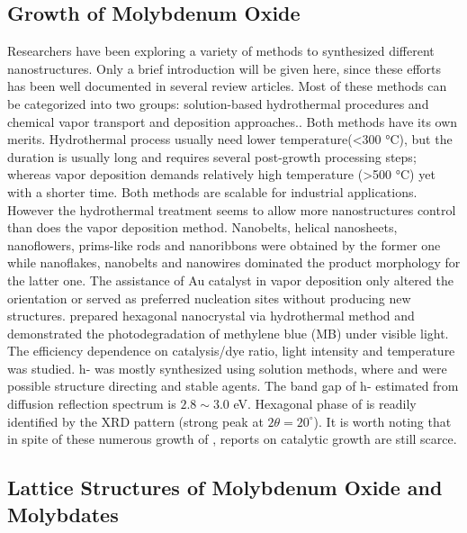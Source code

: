 \subsection{Growth of Molybdenum Oxide}
Researchers have been exploring a variety of methods to synthesized different  nanostructures. Only a brief introduction will be given here, since these efforts has been well documented in several review articles.\cite{He2003} Most of these methods can be categorized into two groups: solution-based hydrothermal procedures \citep{Li2002b,Xia2006,Li2006a,Camacho-Bragado2006} and chemical vapor transport and deposition approaches.\citep{Zeng1998,Li2002c,Li2002d,Zhou2003b,Fibers2007,Yan2009}. Both methods have its own merits. Hydrothermal process usually need lower temperature(\textless 300 \si{\degreeCelsius}), but the duration is usually long and requires several post-growth processing steps; whereas vapor deposition demands relatively high temperature (\textgreater 500 \si{\degreeCelsius}) yet with a shorter time. Both methods are scalable for industrial applications. However the hydrothermal treatment seems to allow more  nanostructures control than does the vapor deposition method. Nanobelts,\cite{Li2002b} helical nanosheets, nanoflowers, prims-like rods\cite{Li2006a} and nanoribbons\cite{Camacho-Bragado2006} were obtained by the former one while nanoflakes,\cite{Chen2009} nanobelts\cite{Hu2009} and nanowires\citep{Zhou2003b,Chen2011b} dominated the product morphology for the latter one. The assistance of Au catalyst in vapor deposition only altered the orientation\cite{Yan2009} or served as preferred nucleation sites\cite{Cai2011} without producing new  structures. \citeauthor{Chithambararaj2013} prepared hexagonal  nanocrystal via hydrothermal method and demonstrated the photodegradation of methylene blue (MB) under visible light.\cite{Chithambararaj2013} The efficiency dependence on catalysis/dye ratio, light intensity and temperature was studied. h- was mostly synthesized using solution methods, where  and  were possible structure directing and stable agents. The band gap of h- estimated from diffusion reflection spectrum is $2.8\sim3.0$ eV. Hexagonal phase of  is readily identified by the XRD pattern (strong peak at $2\theta=20^{\circ}$). It is worth noting that in spite of these numerous growth of , reports on catalytic growth are still scarce. 

\subsection{Lattice Structures of Molybdenum Oxide and Molybdates}

